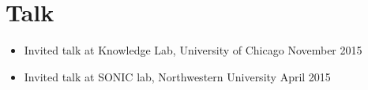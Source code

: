 \section{\sc Talk}

\begin{itemize}[leftmargin=0cm, label={}]

\item Invited talk at Knowledge Lab, University of Chicago \hfill November 2015
\item Invited talk at SONIC lab, Northwestern University   \hfill April 2015

\end{itemize}
